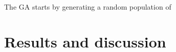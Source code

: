 \documentclass[superbib,unsortedaddress,preprint,byrevtex,aps,noshowpacs,titlepage]{revtex4}
\begin{document}
The GA starts by generating a random population of 



\section{Results and discussion}


\end{document}
